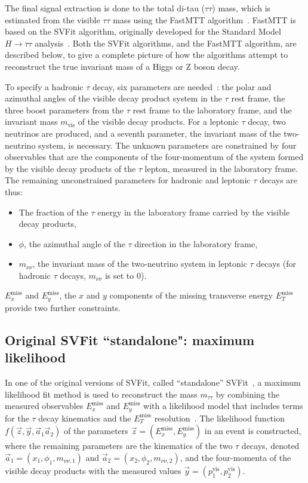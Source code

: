 The final signal extraction is done to the total di-tau ($\tau\tau$) mass, which is estimated from the visible $\tau\tau$ mass using the FastMTT algorithm~\cite{2014_SVFit_Bianchini}. FastMTT is based on the SVFit algorithm, originally developed for the Standard Model $H \rightarrow \tau\tau$ analysis~\cite{CMS-HIG-13-004}. Both the SVFit algorithms, and the FastMTT algorithm, are described below, to give a complete picture of how the algorithms attempt to reconstruct the true invariant mass of a Higgs or Z boson decay.

To specify a hadronic $\tau$ decay, six parameters are needed~\cite{CMS-HIG-13-004}: the polar and azimuthal angles of the visible decay product system in the $\tau$ rest frame, the three boost parameters from the $\tau$ rest frame to the laboratory frame, and the invariant mass $m_{\text{vis}}$ of the visible decay products. For a leptonic $\tau$ decay, two neutrinos are produced, and a seventh parameter, the invariant mass of the two-neutrino system, is necessary. The unknown parameters are constrained by four observables that are the components of the four-momentum of the system formed by the visible decay products of the $\tau$ lepton, measured in the laboratory frame. The remaining unconstrained parameters for hadronic and leptonic $\tau$ decays are thus:

\begin{itemize}
    \item The fraction of the $\tau$ energy in the laboratory frame carried by the visible decay products,
    \item $\phi$, the azimuthal angle of the $\tau$ direction in the laboratory frame,
    \item $m_{\nu\nu}$, the invariant mass of the two-neutrino system in leptonic $\tau$ decays (for hadronic $\tau$ decays, $m_{\nu\nu}$ is set to 0).
\end{itemize}
$E_{x}^{\text{miss}}$ and $E_{y}^{\text{miss}}$, the $x$ and $y$ components of the missing transverse energy $E_{T}^{\text{miss}}$ provide two further constraints. 

\subsection{Original SVFit \texorpdfstring{``standalone"}{"standalone"}: maximum likelihood}
In one of the original versions of SVFit, called ``standalone'' SVFit~\cite{CMS-HIG-13-004}, a maximum likelihood fit method is used to reconstruct the mass $m_{\tau\tau}$ by combining the measured observables $E_{x}^{\text{miss}}$ and $E_{y}^{\text{miss}}$ with a likelihood model that includes terms for the $\tau$ decay kinematics and the $E_{T}^{\text{miss}}$ resolution~\cite{CMS-HIG-13-004}. The likelihood function $f(\vec{z}, \vec{y}, \vec{a}_1 \vec{a}_2)$ of the parameters $\vec{z} = (E_{x}^{\text{miss}}, E_{y}^{\text{miss}})$ in an event is constructed, where the remaining parameters are the kinematics of the two $\tau$ decays, denoted $\vec{a}_1 = (x_1, \phi_1, m_{\nu\nu, 1})$ and $\vec{a}_2 = (x_2, \phi_2, m_{\nu\nu, 2})$, and the four-momenta of the visible decay products with the measured values $\vec{y} = (p_1^{\text{vis}}, p_2^{\text{vis}})$.

